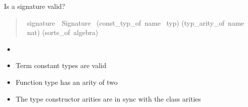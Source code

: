\begin{frame}{Is a signature valid?}
    \begin{quote}
        \begin{isabelle}
            \ signature\ {\isacharequal}\ Signature\ \isanewline
            \isaindent{\ \ }(const\_typ\_of{\isacharcolon}\ name \isasymrightharpoonup\ typ)\isanewline
            \isaindent{\ \ }(typ\_arity\_of{\isacharcolon}\ name \isasymrightharpoonup\ nat)\isanewline
            \isaindent{\ \ }(sorts\_of{\isacharcolon}\ algebra)
        \end{isabelle}
    \end{quote}
    \begin{itemize}
        \item {}
        \item Term constant types are valid
        \item Function type has an arity of two
        \item The type constructor arities are in sync with the class arities
    \end{itemize}



\end{frame}


